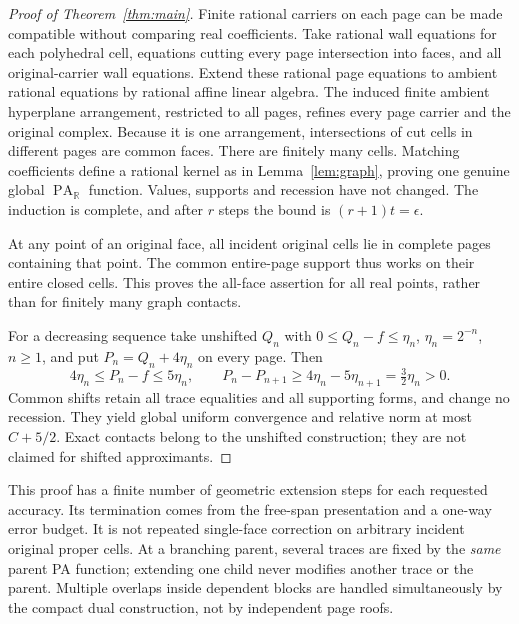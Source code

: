 \documentclass[11pt]{article}
\newcommand{\R}{\mathbb R}
\newcommand{\PA}{\operatorname{PA}}
\begin{document}
\begin{proof}[Proof of Theorem~\ref{thm:main}]
Finite rational carriers on each page can be made compatible without comparing real coefficients. Take rational wall equations for each polyhedral cell, equations cutting every page intersection into faces, and all original-carrier wall equations. Extend these rational page equations to ambient rational equations by rational affine linear algebra. The induced finite ambient hyperplane arrangement, restricted to all pages, refines every page carrier and the original complex. Because it is one arrangement, intersections of cut cells in different pages are common faces. There are finitely many cells. Matching coefficients define a rational kernel as in Lemma~\ref{lem:graph}, proving one genuine global $\PA_\R$ function. Values, supports and recession have not changed. The induction is complete, and after $r$ steps the bound is $(r+1)t=\epsilon$.

At any point of an original face, all incident original cells lie in complete pages containing that point. The common entire-page support thus works on their entire closed cells. This proves the all-face assertion for all real points, rather than for finitely many graph contacts.

For a decreasing sequence take unshifted $Q_n$ with $0\leq Q_n-f\leq\eta_n$, $\eta_n=2^{-n}$, $n\geq1$, and put $P_n=Q_n+4\eta_n$ on every page. Then
\[
4\eta_n\leq P_n-f\leq5\eta_n,
\qquad P_n-P_{n+1}\geq4\eta_n-5\eta_{n+1}=\tfrac32\eta_n>0.
\]
Common shifts retain all trace equalities and all supporting forms, and change no recession. They yield global uniform convergence and relative norm at most $C+5/2$. Exact contacts belong to the unshifted construction; they are not claimed for shifted approximants.
\end{proof}

This proof has a finite number of geometric extension steps for each requested accuracy. Its termination comes from the free-span presentation and a one-way error budget. It is not repeated single-face correction on arbitrary incident original proper cells. At a branching parent, several traces are fixed by the \emph{same} parent PA function; extending one child never modifies another trace or the parent. Multiple overlaps inside dependent blocks are handled simultaneously by the compact dual construction, not by independent page roofs.
\end{document}
